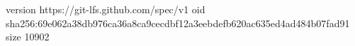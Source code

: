 version https://git-lfs.github.com/spec/v1
oid sha256:69e062a38db976ca36a8ca9cecdbf12a3eebdefb620ac635ed4ad484b07fad91
size 10902
